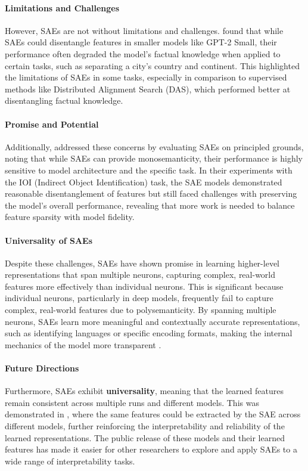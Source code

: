 \documentclass[sigconf,authoryear]{acmart}
\begin{document}
  \paragraph{Limitations and Challenges} However, SAEs are not without limitations and challenges. \citet{chaudhary2024evaluatingopensourcesparseautoencoders} found that while SAEs could disentangle features in smaller models like GPT-2 Small, their performance often degraded the model's factual knowledge when applied to certain tasks, such as separating a city's country and continent. This highlighted the limitations of SAEs in some tasks, especially in comparison to supervised methods like Distributed Alignment Search (DAS), which performed better at disentangling factual knowledge.
  
  \paragraph{Promise and Potential} Additionally, \citet{makelov2024principledevaluationssparseautoencoders} addressed these concerns by evaluating SAEs on principled grounds, noting that while SAEs can provide monosemanticity, their performance is highly sensitive to model architecture and the specific task. In their experiments with the IOI (Indirect Object Identification) task, the SAE models demonstrated reasonable disentanglement of features but still faced challenges with preserving the model's overall performance, revealing that more work is needed to balance feature sparsity with model fidelity.
  
  \paragraph{Universality of SAEs} Despite these challenges, SAEs have shown promise in learning higher-level representations that span multiple neurons, capturing complex, real-world features more effectively than individual neurons. This is significant because individual neurons, particularly in deep models, frequently fail to capture complex, real-world features due to polysemanticity. By spanning multiple neurons, SAEs learn more meaningful and contextually accurate representations, such as identifying languages or specific encoding formats, making the internal mechanics of the model more transparent \citep{cunningham2023sparseautoencodershighlyinterpretable, bricken2023monosemanticity}.
  
  \paragraph{Future Directions} Furthermore, SAEs exhibit \textbf{universality}, meaning that the learned features remain consistent across multiple runs and different models. This was demonstrated in \citet{bricken2023monosemanticity}, where the same features could be extracted by the SAE across different models, further reinforcing the interpretability and reliability of the learned representations. The public release of these models and their learned features \citep{lieberum2024gemmascopeopensparse} has made it easier for other researchers to explore and apply SAEs to a wide range of interpretability tasks.
  
\end{document}
